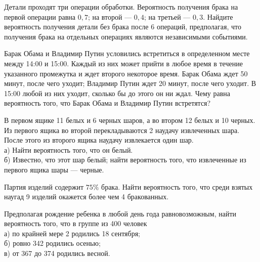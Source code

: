 \newpage\setcounter{zad}{0}



\begin{zkrW}{20}\noindent 
	Детали проходят три операции обработки. Вероятность получения брака на первой операции равна $0{,}7$; на второй --- $0{,}4$; на третьей --- $0{,}3$. Найдите вероятность получения детали без брака после 6 операций, предполагая, что получения брака на отдельных операциях являются независимыми событиями.
 
\end{zkrW}

\begin{zkrW}{20}\noindent 
	Барак Обама и Владимир Путин условились встретиться в определенном месте между 14:00 и 15:00. Каждый из них может прийти в любое время в течение указанного промежутка и ждет второго некоторое время. Барак Обама ждет 50 минут, после чего уходит; Владимир Путин ждет 20 минут, после чего уходит. В 15:00 любой из них уходит, сколько бы до этого он ни ждал. Чему равна вероятность того, что Барак Обама и Владимир Путин встретятся?
 
\end{zkrW}

\begin{zkrW}{20}\noindent 
	В первом ящике 11 белых и 6 черных шаров, а во втором 12 белых и 10 черных. Из первого ящика во второй перекладываются 2 наудачу извлеченных шара. После этого из второго ящика наудачу извлекается один шар. \\ \indent а) Найти вероятность того, что он белый. \\ \indent б) Известно, что этот шар белый; найти вероятность того, что извлеченные из первого ящика шары --- черные.
 
\end{zkrW}

\begin{zkrW}{20}\noindent 
	Партия изделий содержит $75\%$ брака. Найти вероятность того, что среди взятых наугад 9 изделий окажется более чем 4 бракованных.
 
\end{zkrW}

\begin{zkrW}{20}\noindent 
	Предполагая рождение ребенка в любой день года равновозможным, найти вероятность того, что в группе из 400 человек \\ \indent а) по крайней мере 2 родились 18 сентября; \\ \indent б) ровно 342 родились осенью; \\ \indent в) от 367 до 374 родились весной.
 
\end{zkrW}

